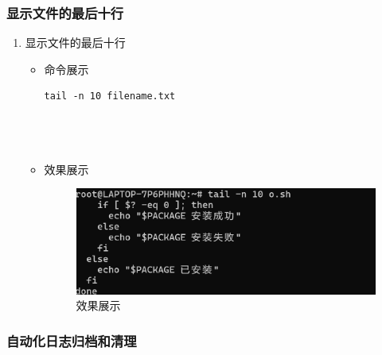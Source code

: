 \documentclass[UTF8]{ctexart}
\begin{document}
\subsubsection{显示文件的最后十行}

\begin{enumerate}
  \item 显示文件的最后十行
  \begin{itemize}
  \item 命令展示
  \begin{verbatim}
tail -n 10 filename.txt


    
  \end{verbatim}

  \item 效果展示
  \begin{figure}[H]
    \centering
    \includegraphics[width=\textwidth]{16} %
    \caption{效果展示}
  
  \end{figure}
\end{itemize}
\end{enumerate}
\subsubsection{自动化日志归档和清理}
\end{document}
